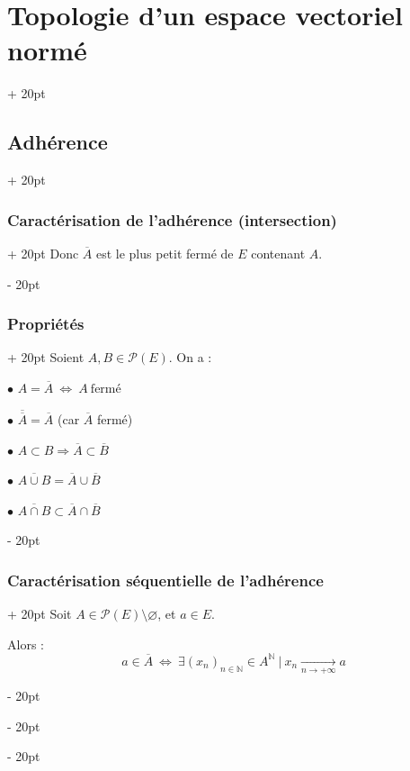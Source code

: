 \documentclass[a4paper, 12pt, twoside]{article}
\newcommand{\N}{\mathbb{N}} %
\newcommand{\cj}[1]{\overline{#1}} %
\newcommand{\tendsto}[1]{\xrightarrow[#1]{}}
\newcommand{\ssi}{\ \Leftrightarrow \ }
\newcommand{\ind}[1][20pt]{\advance\leftskip + #1}
\newcommand{\deind}[1][20pt]{\advance\leftskip - #1}
\newenvironment{indt}[2][20pt]{#2 \par \ind[#1]}{\par \deind} %
\begin{document}
\begin{indt}{\section{Topologie d'un espace vectoriel normé}}
\begin{indt}{\subsection{Adhérence}}
\begin{indt}{\subsubsection{Caractérisation de l'adhérence (intersection)}}
                Donc $\cj A$ est le plus petit fermé de $E$ contenant $A$.
            \end{indt}

            \vspace{12pt}
            
            \begin{indt}{\subsubsection{Propriétés}}
                Soient $A, B \in \mathcal P(E)$. On a :

                \vspace{6pt}
                
                $\bullet$ $A = \cj A \ssi A\ \text{fermé}$

                \vspace{3pt}

                $\bullet$ $\cj{\cj{A}} = \cj A$ (car $\cj A$ fermé)

                \vspace{3pt}

                $\bullet$ $A \subset B \Rightarrow \cj A \subset \cj B$

                \vspace{3pt}

                $\bullet$ $\cj{A \cup B} = \cj A \cup \cj B$

                \vspace{3pt}

                $\bullet$ $\cj{A \cap B} \subset \cj A \cap \cj B$
            \end{indt}

            \vspace{12pt}
            
            \begin{indt}{\subsubsection{Caractérisation séquentielle de l'adhérence}}
                Soit $A \in \mathcal P(E) \setminus \varnothing$, et $a \in E$.

                Alors :
                \[
                    a \in \cj A
                    \ssi
                    \exists (x_n)_{n \in \N} \in A^\N\ |\ x_n \tendsto{n \to +\infty} a
                \]
            \end{indt}


\end{indt}
\end{indt}
\end{document}
